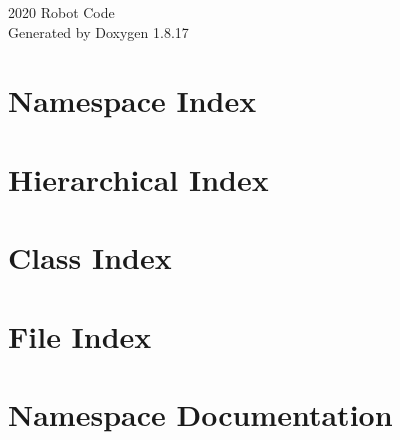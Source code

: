 \let\mypdfximage\pdfximage\def\pdfximage{\immediate\mypdfximage}\documentclass[twoside]{book}
\newcommand{\+}{\discretionary{\mbox{\scriptsize$\hookleftarrow$}}{}{}}
\newcommand{\clearemptydoublepage}{%
  \newpage{\pagestyle{empty}\cleardoublepage}%
}
\begin{document}
\hypersetup{pageanchor=false,
             bookmarksnumbered=true,
             pdfencoding=unicode
            }
\begin{titlepage}
\vspace*{7cm}
\begin{center}%
{\Large 2020 Robot Code }\\
\vspace*{1cm}
{\large Generated by Doxygen 1.8.17}\\
\end{center}
\end{titlepage}
\clearemptydoublepage
{}
\tableofcontents
\clearemptydoublepage
{}
\hypersetup{pageanchor=true}

\chapter{Namespace Index}

\chapter{Hierarchical Index}

\chapter{Class Index}

\chapter{File Index}

\chapter{Namespace Documentation}





















\end{document}
